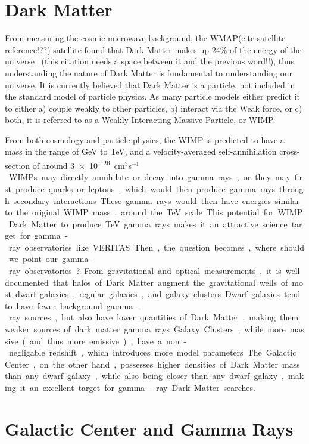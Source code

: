 \section{Dark Matter}

  From measuring the cosmic microwave background, the WMAP{\color{red}(cite satellite reference!??)} satellite found that Dark Matter makes up 24\% of the energy of the universe~\cite{pdg_2012} {\color{red}(this citation needs a space between it and the previous word!!)}, thus understanding the nature of Dark Matter is fundamental to understanding our universe.
  It is currently believed that Dark Matter is a particle, not included in the standard model of particle physics.
  As many particle models either predict it to either a) couple weakly to other particles, b) interact via the Weak force, or c) both, it is referred to as a Weakly Interacting Massive Particle, or WIMP.

  From both cosmology and particle physics, the WIMP is predicted to have a mass in the range of GeV to TeV, and a velocity-averaged self-annihilation cross-section of around \nicetilde{}\SI{3e-26}{cm${}^3$s${}^{-1}$}.
  WIMPs may directly annihilate or decay into gamma rays, or they may first produce quarks or leptons, which would then produce gamma rays through secondary interactions.
  These gamma rays would then have energies similar to the original WIMP mass, around the TeV scale.
  This potential for WIMP Dark Matter to produce TeV gamma rays makes it an attractive science target for gamma-ray observatories like VERITAS.

  Then, the question becomes, where should we point our gamma-ray observatories?
  From gravitational and optical measurements, it is well documented that halos of Dark Matter augment the gravitational wells of most dwarf galaxies, regular galaxies, and galaxy clusters.
  Dwarf galaxies tend to have fewer background gamma-ray sources, but also have lower quantities of Dark Matter, making them weaker sources of dark matter gamma rays.
  Galaxy Clusters, while more massive (and thus more emissive), have a non-negligable redshift, which introduces more model parameters.
  The Galactic Center, on the other hand, possesses higher densities of Dark Matter mass than any dwarf galaxy, while also being closer than any dwarf galaxy, making it an excellent target for gamma-ray Dark Matter searches.


\section{Galactic Center and Gamma Rays}

